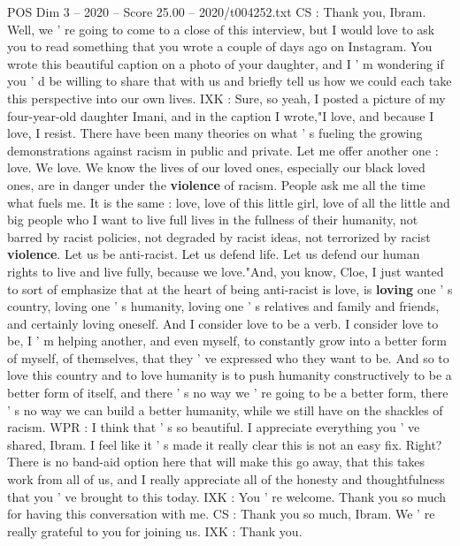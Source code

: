 \begin{textsample}{POS Dim 3 – 2020 – Score 25.00 – 2020/t004252.txt}
CS : Thank you, Ibram.
Well, we ' re going to come to a close of this interview, but I would love to ask you to read something that you wrote a couple of days ago on Instagram.
You wrote this beautiful caption on a photo of your daughter, and I ' m wondering if you ' d be willing to share that with us and briefly tell us how we could each take this perspective into our own lives.
IXK : Sure, so yeah, I posted a picture of my four-year-old daughter Imani, and in the caption I wrote,"I love, and because I love, I resist.
There have been many theories on what ' s fueling the growing demonstrations against racism in public and private.
Let me offer another one : love.
We love.
We know the lives of our loved ones, especially our black loved ones, are in danger under the \textbf{violence} of racism.
People ask me all the time what fuels me.
It is the same : love, love of this little girl, love of all the little and big people who I want to live full lives in the fullness of their humanity, not barred by racist policies, not degraded by racist ideas, not terrorized by racist \textbf{violence}.
Let us be anti-racist.
Let us defend life.
Let us defend our human rights to live and live fully, because we love."And, you know, Cloe, I just wanted to sort of emphasize that at the heart of being anti-racist is love, is \textbf{loving} one ' s country, loving one ' s humanity, loving one ' s relatives and family and friends, and certainly loving oneself.
And I consider love to be a verb.
I consider love to be, I ' m helping another, and even myself, to constantly grow into a better form of myself, of themselves, that they ' ve expressed who they want to be.
And so to love this country and to love humanity is to push humanity constructively to be a better form of itself, and there ' s no way we ' re going to be a better form, there ' s no way we can build a better humanity, while we still have on the shackles of racism.
WPR : I think that ' s so beautiful.
I appreciate everything you ' ve shared, Ibram.
I feel like it ' s made it really clear this is not an easy fix.
Right?
There is no band-aid option here that will make this go away, that this takes work from all of us, and I really appreciate all of the honesty and thoughtfulness that you ' ve brought to this today.
IXK : You ' re welcome.
Thank you so much for having this conversation with me.
CS : Thank you so much, Ibram.
We ' re really grateful to you for joining us.
IXK : Thank you.

\end{textsample}
